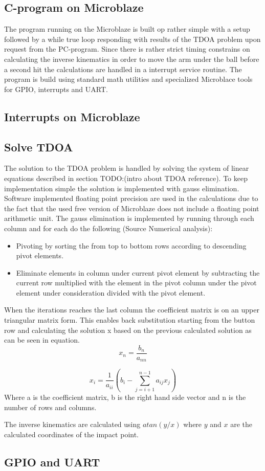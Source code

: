\subsection{C-program on Microblaze}
The program running on the Microblaze is built op rather simple with a setup followed by a while true loop responding with results of the TDOA problem upon request from the PC-program. Since there is rather strict timing constrains on calculating the inverse kinematics in order to move the arm under the ball before a second hit the calculations are handled in a interrupt service routine. The program is build using standard math utilities and specialized Microblace tools for GPIO, interrupts and UART.

\subsection{Interrupts on Microblaze}


\subsection{Solve TDOA}
The solution to the TDOA problem is handled by solving the system of linear equations described in section TODO:(intro about TDOA reference). To keep implementation simple the solution is implemented with gauss elimination. Software implemented floating point precision are used in the calculations due to the fact that the used free version of Microblaze does not include a floating point arithmetic unit. 
The gauss elimination is implemented by running through each column and for each do the following (Source Numerical analysis):
\begin{itemize}
	\item Pivoting by sorting the from top to bottom rows according to descending pivot elements.
	\item Eliminate elements in column under current pivot element by subtracting the current row multiplied with the element in the pivot column under the pivot element under consideration divided with the pivot element.
\end{itemize}

When the iterations reaches the last column the coefficient matrix is on an upper triangular matrix form. This enables back substitution starting from the button row and calculating the solution x based on the previous calculated solution as can be seen in equation.
\begin{equation}
	x_n = \frac{b_n}{a_{nn}}
\end{equation}

\begin{equation}
	x_i = \frac{1}{a_{ii}} (b_i - \sum_{j=i+1}^{n-1} a_{ij}x_j)
\end{equation}
Where a is the coefficient matrix, b is the right hand side vector and n is the number of rows and columns.

The inverse kinematics are calculated using $atan(y/x)$ where $y$ and $x$ are the calculated coordinates of the impact point. 

\subsection{GPIO and UART}
